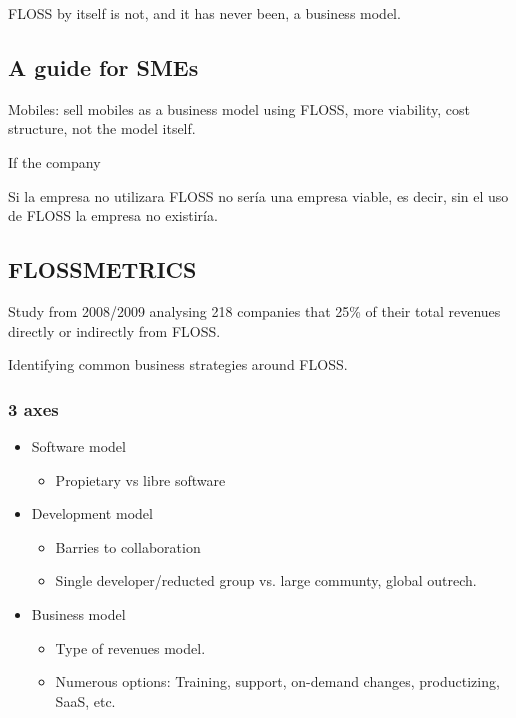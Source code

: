 FLOSS by itself is not, and it has never been, a business model.

\subsection{A guide for SMEs}

Mobiles: sell mobiles as a business model using FLOSS, more viability, cost
 structure, not the model itself.

If the company

Si la empresa no utilizara FLOSS no sería una empresa viable, es decir, sin el
 uso de FLOSS la empresa no existiría.

\subsection{FLOSSMETRICS}

Study from 2008/2009 analysing 218 companies that 25\% of their total revenues
 directly or indirectly from FLOSS.

Identifying common business strategies around FLOSS.

\subsubsection{3 axes}

\begin{itemize}
    \item Software model
    \begin{itemize}
        \item Propietary vs libre software
    \end{itemize}
    
    \item Development model
    \begin{itemize}
        \item Barries to collaboration
        \item Single developer/reducted group vs. large communty, global outrech.
    \end{itemize}
    
    \item Business model
    \begin{itemize}
        \item Type of revenues model.
        \item Numerous options: Training, support, on-demand changes, productizing, SaaS, etc.
    \end{itemize}
\end{itemize}

